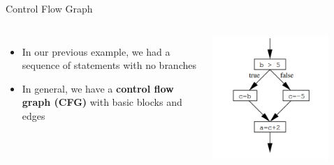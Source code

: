 \documentclass[aspectratio=169,xcolor=dvipsnames]{beamer}
\begin{document}
\begin{frame}[fragile]{Control Flow Graph}

	\begin{columns}[c] %


		\begin{itemize}
			\item In our previous example, we had a sequence of statements with no branches
			\item In general, we have a {\bf control flow graph (CFG)} with basic blocks and edges
		\end{itemize}

		\includegraphics[width=0.8\textwidth]{img/2.png}
	\end{columns}
\end{frame}

\end{document}
